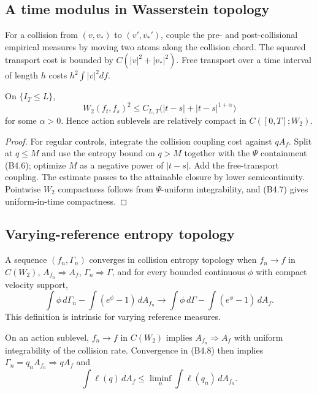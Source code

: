 \subsection{A time modulus in Wasserstein topology}

For a collision from $(v,v_*)$ to $(v',v_*')$, couple the pre- and
post-collisional empirical measures by moving two atoms along the collision
chord.  The squared transport cost is bounded by
$C(|v|^2+|v_*|^2)$.  Free transport over a time interval of length $h$ costs
$h^2\int|v|^2df$.

\begin{lemma}
\label{lem:r27-b4-modulus}
On $\{I_T\le L\}$,
\[
 W_2(f_t,f_s)^2
 \le C_{L,T}\bigl(|t-s|+|t-s|^{1+\alpha}\bigr)            \tag{B4.7}
\]
for some $\alpha>0$.  Hence action sublevels are relatively compact in
$C([0,T];W_2)$.
\end{lemma}

\begin{proof}
For regular controls, integrate the collision coupling cost against
$qA_f$.  Split at $q\le M$ and use the entropy bound on $q>M$ together with
the $\Psi$ containment (B4.6); optimize $M$ as a negative power of
$|t-s|$.  Add the free-transport coupling.  The estimate passes to the
attainable closure by lower semicontinuity.  Pointwise $W_2$ compactness follows
from $\Psi$-uniform integrability, and (B4.7) gives uniform-in-time
compactness.
\end{proof}

\subsection{Varying-reference entropy topology}

A sequence $(f_n,\Gamma_n)$ converges in collision entropy topology when
$f_n\to f$ in $C(W_2)$, $A_{f_n}\Rightarrow A_f$, $\Gamma_n\Rightarrow\Gamma$,
and for every bounded continuous $\phi$ with compact velocity support,
\[
 \int\phi\,d\Gamma_n-\int(e^\phi-1)\,dA_{f_n}
 \longrightarrow
 \int\phi\,d\Gamma-\int(e^\phi-1)\,dA_f.                  \tag{B4.8}
\]
This definition is intrinsic for varying reference measures.

\begin{proposition}
\label{prop:r27-b4-product}
On an action sublevel, $f_n\to f$ in $C(W_2)$ implies
$A_{f_n}\Rightarrow A_f$ with uniform integrability of the collision rate.
Convergence in (B4.8) then implies
$\Gamma_n=q_nA_{f_n}\Rightarrow qA_f$ and
\[
 \int\ell(q)\,dA_f\le\liminf_n\int\ell(q_n)\,dA_{f_n}.     \tag{B4.9}
\]
\end{proposition}

